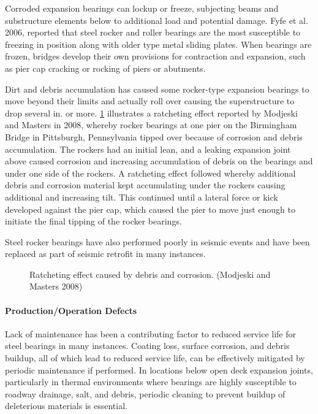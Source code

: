 Corroded expansion bearings can lockup or freeze, subjecting beams and substructure elements below to
additional load and potential damage. Fyfe et al. 2006, reported that steel rocker and roller bearings are the most
susceptible to freezing in position along with older type metal sliding plates. When bearings are frozen, bridges
develop their own provisions for contraction and expansion, such as pier cap cracking or rocking of piers or
abutments.

Dirt and debris accumulation has caused some rocker-type expansion bearings to move beyond their limits and actually roll over causing the superstructure to drop several in. or more. \cref{fig:ratchet-debris-corrosion} illustrates a ratcheting effect reported by Modjeski and Masters in 2008, whereby rocker bearings at one pier on the Birmingham Bridge in Pittsburgh, Pennsylvania tipped over because of corrosion and debris accumulation. The rockers had an initial lean, and a leaking expansion joint above caused corrosion and increasing accumulation of debris on the bearings and under one side of the rockers. A ratcheting effect followed whereby additional debris and corrosion material kept accumulating under the rockers causing additional and increasing tilt. This continued until a lateral force or kick developed against the pier cap, which caused the pier to move just enough to initiate the final tipping of the rocker bearings.

Steel rocker bearings have also performed poorly in seismic events and have been replaced as part of seismic retrofit in many instances.

\begin{figure}
  \caption{Ratcheting effect caused by debris and corrosion. (Modjeski and Masters 2008)}\label{fig:ratchet-debris-corrosion}
\end{figure}

\paragraph{Production/Operation Defects}
Lack of maintenance has been a contributing factor to reduced service life for steel bearings in many instances.
Coating loss, surface corrosion, and debris buildup, all of which lead to reduced service life, can be effectively
mitigated by periodic maintenance if performed. In locations below open deck expansion joints, particularly in
thermal environments where bearings are highly susceptible to roadway drainage, salt, and debris, periodic cleaning
to prevent buildup of deleterious materials is essential.

